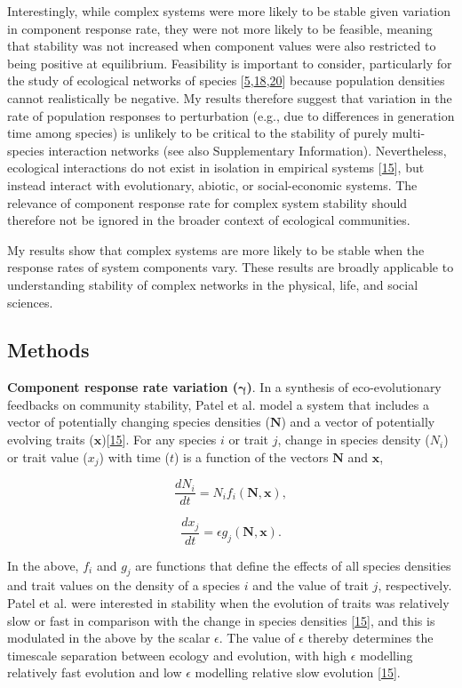 \documentclass[]{article}
\begin{document}
Interestingly, while complex systems were more likely to be stable given
variation in component response rate, they were not more likely to be
feasible, meaning that stability was not increased when component values
were also restricted to being positive at equilibrium. Feasibility is
important to consider, particularly for the study of ecological networks
of species
{[}\protect\hyperlink{ref-Grilli2017}{5},\protect\hyperlink{ref-Stone2017}{18},\protect\hyperlink{ref-Dougoud2018}{20}{]}
because population densities cannot realistically be negative. My
results therefore suggest that variation in the rate of population
responses to perturbation (e.g., due to differences in generation time
among species) is unlikely to be critical to the stability of purely
multi-species interaction networks (see also Supplementary Information).
Nevertheless, ecological interactions do not exist in isolation in
empirical systems {[}\protect\hyperlink{ref-Patel2018}{15}{]}, but
instead interact with evolutionary, abiotic, or social-economic systems.
The relevance of component response rate for complex system stability
should therefore not be ignored in the broader context of ecological
communities.

My results show that complex systems are more likely to be stable when
the response rates of system components vary. These results are broadly
applicable to understanding stability of complex networks in the
physical, life, and social sciences.

\subsection{Methods}\label{methods}

\textbf{Component response rate variation (\(\mathbf{\gamma}\))}. In a
synthesis of eco-evolutionary feedbacks on community stability, Patel et
al. model a system that includes a vector of potentially changing
species densities (\(\mathbf{N}\)) and a vector of potentially evolving
traits (\(\mathbf{x}\)){[}\protect\hyperlink{ref-Patel2018}{15}{]}. For
any species \(i\) or trait \(j\), change in species density (\(N_{i}\))
or trait value (\(x_{j}\)) with time (\(t\)) is a function of the
vectors \(\mathbf{N}\) and \(\mathbf{x}\),

\[\frac{dN_{i}}{dt} = N_{i}f_{i}(\mathbf{N}, \mathbf{x}),\]

\[\frac{dx_{j}}{dt} = \epsilon g_{j}(\mathbf{N}, \mathbf{x}).\]

In the above, \(f_{i}\) and \(g_{j}\) are functions that define the
effects of all species densities and trait values on the density of a
species \(i\) and the value of trait \(j\), respectively. Patel et al.
were interested in stability when the evolution of traits was relatively
slow or fast in comparison with the change in species densities
{[}\protect\hyperlink{ref-Patel2018}{15}{]}, and this is modulated in
the above by the scalar \(\epsilon\). The value of \(\epsilon\) thereby
determines the timescale separation between ecology and evolution, with
high \(\epsilon\) modelling relatively fast evolution and low
\(\epsilon\) modelling relative slow evolution
{[}\protect\hyperlink{ref-Patel2018}{15}{]}.
\end{document}
